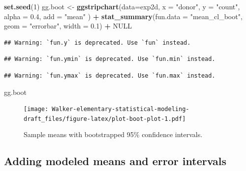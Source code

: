 \documentclass[]{book}
\newenvironment{Shaded}{\begin{snugshade}}{\end{snugshade}}
\newcommand{\DataTypeTok}[1]{\textcolor[rgb]{0.13,0.29,0.53}{#1}}
\newcommand{\DecValTok}[1]{\textcolor[rgb]{0.00,0.00,0.81}{#1}}
\newcommand{\FloatTok}[1]{\textcolor[rgb]{0.00,0.00,0.81}{#1}}
\newcommand{\KeywordTok}[1]{\textcolor[rgb]{0.13,0.29,0.53}{\textbf{#1}}}
\newcommand{\NormalTok}[1]{#1}
\newcommand{\OperatorTok}[1]{\textcolor[rgb]{0.81,0.36,0.00}{\textbf{#1}}}
\newcommand{\OtherTok}[1]{\textcolor[rgb]{0.56,0.35,0.01}{#1}}
\newcommand{\StringTok}[1]{\textcolor[rgb]{0.31,0.60,0.02}{#1}}
\begin{document}
\begin{Shaded}
\begin{Highlighting}[]
\KeywordTok{set.seed}\NormalTok{(}\DecValTok{1}\NormalTok{)}
\NormalTok{gg.boot <-}\StringTok{ }\KeywordTok{ggstripchart}\NormalTok{(}\DataTypeTok{data=}\NormalTok{exp2d,}
                   \DataTypeTok{x =} \StringTok{"donor"}\NormalTok{, }
                   \DataTypeTok{y =} \StringTok{"count"}\NormalTok{, }
                   \DataTypeTok{alpha =} \FloatTok{0.4}\NormalTok{,}
                   \DataTypeTok{add =} \StringTok{"mean"}
\NormalTok{) }\OperatorTok{+}\StringTok{ }
\StringTok{  }\KeywordTok{stat_summary}\NormalTok{(}\DataTypeTok{fun.data =} \StringTok{"mean_cl_boot"}\NormalTok{, }
               \DataTypeTok{geom =} \StringTok{"errorbar"}\NormalTok{, }
               \DataTypeTok{width =} \FloatTok{0.1}\NormalTok{) }\OperatorTok{+}
\StringTok{  }\OtherTok{NULL}
\end{Highlighting}
\end{Shaded}

\begin{verbatim}
## Warning: `fun.y` is deprecated. Use `fun` instead.
\end{verbatim}

\begin{verbatim}
## Warning: `fun.ymin` is deprecated. Use `fun.min` instead.
\end{verbatim}

\begin{verbatim}
## Warning: `fun.ymax` is deprecated. Use `fun.max` instead.
\end{verbatim}

\begin{Shaded}
\begin{Highlighting}[]
\NormalTok{gg.boot}
\end{Highlighting}
\end{Shaded}

\begin{figure}
\centering
\texttt{[image: Walker-elementary-statistical-modeling-draft\_files/figure-latex/plot-boot-plot-1.pdf]}
\caption{\label{fig:plot-boot-plot}Sample means with bootstrapped 95\% confidence intervals.}
\end{figure}

\hypertarget{adding-modeled-means-and-error-intervals}{%
\subsection{Adding modeled means and error intervals}\label{adding-modeled-means-and-error-intervals}}
\end{document}

